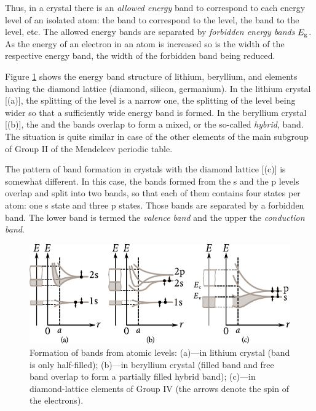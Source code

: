 Thus, in a crystal there is an \textit{allowed energy} band to correspond to each energy level of an isolated atom: the  band to correspond to the  level, the  band to the  level, etc. The allowed energy bands are separated by \textit{forbidden energy bands} $E_{\text{g}}$. As the energy of an electron in an atom is increased so is the width of the respective energy band, the width of the forbidden band being reduced.

Figure \ref{fig:5_7} shows the energy band structure of lithium, beryllium, and elements having the diamond lattice (diamond, silicon, germanium). In the lithium crystal [(a)], the splitting of the  level is a narrow one, the splitting of the  level being wider so that a sufficiently wide  energy band is formed. In the beryllium crystal [(b)], the  and the  bands overlap to form a mixed, or the so-called \textit{hybrid}, band. The situation is quite similar in case of the other elements of the main subgroup of Group II of the Mendeleev periodic table.

The pattern of band formation in crystals with the diamond lattice [(c)] is somewhat different. In this case, the bands formed from the s and the p levels overlap and split into two bands, so that each of them contains four states per atom: one s state and three p states. Those bands are separated by a forbidden band. The lower band is termed the \textit{valence band} and the upper the \textit{conduction band}.

\begin{figure}[t]
	\begin{center}
		\includegraphics[scale=1.1]{figures/ch_05/fig_5_7.pdf}
		\caption[]{Formation of bands from atomic levels: (a)---in lithium crystal (band  is only half-filled); (b)---in beryllium crystal (filled  band and free  band overlap to form a partially filled hybrid band); (c)---in diamond-lattice elements of Group IV (the arrows denote the spin of the electrons).}
		\label{fig:5_7}
	\end{center}
	\vspace{-0.7cm}
\end{figure}

